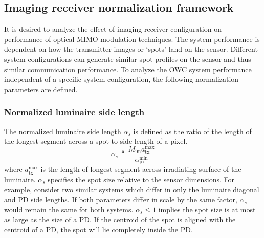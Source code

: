 \subsection{Imaging receiver normalization framework}
\label{subsec:mimoImagingFramework}
\graphicspath{{_MIMOSpace/figures_osm/}}

It is desired to analyze the effect of imaging receiver configuration on performance of optical MIMO modulation techniques. The system performance is dependent on how the transmitter images or `spots' land on the sensor. Different system configurations can generate similar spot profiles on the sensor and thus similar communication  performance. To analyze the OWC system performance independent of a specific system configuration, the following normalization parameters are defined.

\subsubsection{Normalized luminaire side length}
\label{subsubsec:frameworkSide}
The normalized luminaire side length $\alpha_{s}$ is defined as the ratio of the length of the longest segment across a spot to side length of a pixel. 
\begin{equation}
	\label{eqAlphaS}
	\alpha_{s} \triangleq \frac{M_{\text{im}} a_{\text{tx}}^{\text{max}}}{\alpha_{\text{px}}^{\text{min}}}
\end{equation}
where $a_{\text{tx}}^{\text{max}}$ is the length of longest segment across irradiating surface of the luminaire. $\alpha_{s}$ specifies the spot size relative to the sensor dimensions. For example, consider two similar systems which differ in only the luminaire diagonal and PD side lengths. If both parameters differ in scale by the same factor, $\alpha_{s}$ would remain the same for both systems. $\alpha_{s}\leq 1$ implies the spot size is at most as large as the size of a PD. If the centroid of the spot is aligned with the centroid of a PD, the spot will lie completely inside the PD.
 
